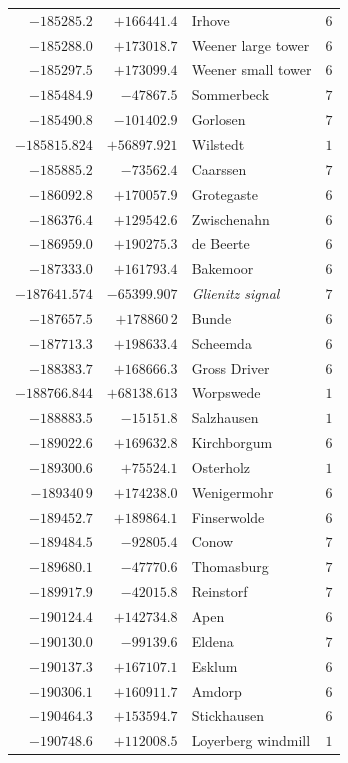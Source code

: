 \begin{center}
\begin{tabular}{r|r|p{170pt}|r}
\(-185285.2\)&\(+166441.4\)&Irhove&\(6\)\\
\(-185288.0\)&\(+173018.7\)&Weener large tower&\(6\)\\
\(-185297.5\)&\(+173099.4\)&Weener small tower&\(6\)\\
\(-185484.9\)&\(-47867.5\)&Sommerbeck&\(7\)\\
\(-185490.8\)&\(-101402.9\)&Gorlosen&\(7\)\\
\(-185815.824\)&\(+56897.921\)&Wilstedt&\(1\)\\
\(-185885.2\)&\(-73562.4\)&Caarssen&\(7\)\\
\(-186092.8\)&\(+170057.9\)&Grotegaste&\(6\)\\
\(-186376.4\)&\(+129542.6\)&Zwischenahn&\(6\)\\
\(-186959.0\)&\(+190275.3\)&de Beerte&\(6\)\\
\(-187333.0\)&\(+161793.4\)&Bakemoor&\(6\)\\
\(-187641.574\)&\(-65399.907\)&\textit{Glienitz signal}&\(7\)\\
\(-187657.5\)&\(+178860\,2\)&Bunde&\(6\)\\
\(-187713.3\)&\(+198633.4\)&Scheemda&\(6\)\\
\(-188383.7\)&\(+168666.3\)&Gross Driver&\(6\)\\
\(-188766.844\)&\(+68138.613\)&Worpswede&\(1\)\\
\(-188883.5\)&\(-15151.8\)&Salzhausen&\(1\)\\
\(-189022.6\)&\(+169632.8\)&Kirchborgum&\(6\)\\
\(-189300.6\)&\(+75524.1\)&Osterholz&\(1\)\\
\(-189340\,9\)&\(+174238.0\)&Wenigermohr&\(6\)\\
\(-189452.7\)&\(+189864.1\)&Finserwolde&\(6\)\\
\(-189484.5\)&\(-92805.4\)&Conow&\(7\)\\
\(-189680.1\)&\(-47770.6\)&Thomasburg&\(7\)\\
\(-189917.9\)&\(-42015.8\)&Reinstorf&\(7\)\\
\(-190124.4\)&\(+142734.8\)&Apen&\(6\)\\
\(-190130.0\)&\(-99139.6\)&Eldena&\(7\)\\
\(-190137.3\)&\(+167107.1\)&Esklum&\(6\)\\
\(-190306.1\)&\(+160911.7\)&Amdorp&\(6\)\\
\(-190464.3\)&\(+153594.7\)&Stickhausen&\(6\)\\
\(-190748.6\)&\(+112008.5\)&Loyerberg windmill&\(1\)\\
\hline\end{tabular}\endgroup\end{center}

